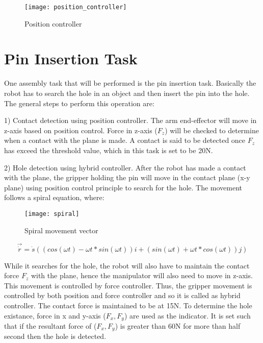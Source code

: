 \begin{figure}[H]
    \centering
    \texttt{[image: position\_controller]}
    \caption{Position controller}
    \label{fig: Position controller}
\end{figure}


\section{Pin Insertion Task}

One assembly task that will be performed is the pin insertion task. Basically the robot has to search the hole in an object and then insert the pin into the hole. The general steps to perform this operation are:

1) Contact detection using position controller. The arm end-effector will move in z-axis based on position control. Force in z-axis ($F_{z}$) will be checked to determine when a contact with the plane is made. A contact is said to be detected once $F_{z}$ has exceed the threshold value, which in this task is set to be 20N.  

2) Hole detection using hybrid controller. After the robot has made a contact with the plane, the gripper holding the pin will move in the contact plane (x-y plane) using position control principle to search for the hole. The movement follows a spiral equation, where:

\begin{figure}[H]
    \centering
    \texttt{[image: spiral]}
    \caption{Spiral movement vector}
\end{figure}

\begin{equation}
  \vec{\dot{r}} = \dot{s}\left(\left( cos\left(\omega t\right) - \omega t * sin\left(\omega t\right) \right)i + \left( sin\left(\omega t\right) + \omega t * cos\left(\omega t\right) \right)j\right)
\end{equation}

While it searches for the hole, the robot will also have to maintain the contact force $F_{z}$ with the plane, hence the manipulator will also need to move in z-axis. This movement is controlled by force controller. Thus, the gripper movement is controlled by both position and force controller and so it is called as hybrid controller. The contact force is maintained to be at 15N. To determine the hole existance, force in x and y-axis ($F_{x}, F_{y}$) are used as the indicator. It is set such that if the resultant force of ($F_{x}, F_{y}$) is greater than 60N for more than half second then the hole is detected.

